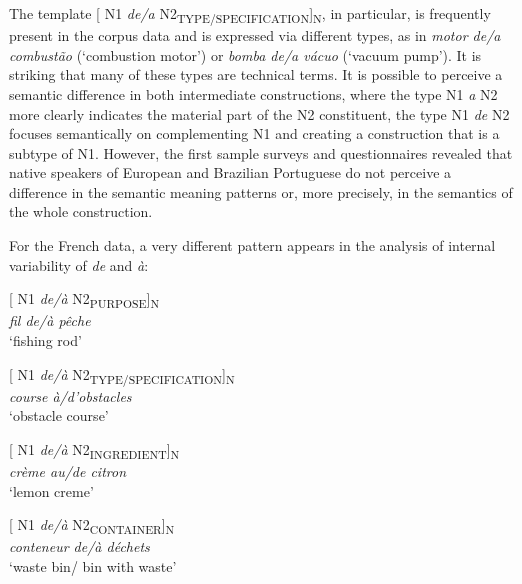 \documentclass[output=paper]{langsci/langscibook}
\begin{document}
The template [ N1 \textit{de/a} N2\textsubscript{TYPE/SPECIFICATION}]\textsubscript{N}, in particular, is frequently present in the corpus data and is expressed via different types, as in \textit{motor de/a combustão} (`combustion motor') or \textit{bomba de/a vácuo} (`vacuum pump'). It is striking that many of these types are technical terms. It is possible to perceive a semantic difference in both intermediate constructions, where the type N1 \textit{a} N2 more clearly indicates the material part of the N2 constituent, the type N1 \textit{de} N2 focuses semantically on complementing N1 and creating a construction that is a subtype of N1. However, the first sample surveys and questionnaires revealed that native speakers of European and Brazilian Portuguese do not perceive a difference in the semantic meaning patterns or, more precisely, in the semantics of the whole construction.

For the French data, a very different pattern appears in the analysis of internal variability of \textit{de} and \textit{à}: 

 \begin{minipage}{0.4\textwidth}    %
[ N1 \textit{de/à} N2\textsubscript{PURPOSE}]\textsubscript{N}\\
\textit{fil de/à pêche}\\
`fishing rod'
\end{minipage} 
\hfill            %
\begin{minipage}{0.4\textwidth}
[ N1 \textit{de/à} N2\textsubscript{TYPE/SPECIFICATION}]\textsubscript{N}\\
\textit{course à/d’obstacles}\\
`obstacle course'
\end{minipage} 
\vspace{0.5cm}

\begin{minipage}{0.4\textwidth}
[ N1 \textit{de/à} N2\textsubscript{INGREDIENT}]\textsubscript{N}\\
\textit{crème au/de citron}\\
`lemon creme'
\end{minipage}
\hfill 
\begin{minipage}{0.4\textwidth}
[ N1 \textit{de/à} N2\textsubscript{CONTAINER}]\textsubscript{N}\\
\textit{conteneur de/à déchets }\\
`waste bin/ bin with waste'
\end{minipage}
\vspace{0.5cm}
\end{document}

